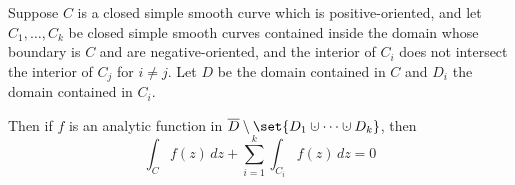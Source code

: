 \documentclass[10pt]{article}
\begin{document}
\begin{thrm*}

    Suppose $C$ is a closed simple smooth curve which is positive-oriented, and let $C_1,\dots,C_k$ be closed simple smooth curves contained inside the domain whose boundary is $C$ and are negative-oriented,
    and the interior of $C_i$ does not intersect the interior of $C_j$ for $i\neq j$.
    Let $D$ be the domain contained in $C$ and $D_i$ the domain contained in $C_i$.

    Then if $f$ is an analytic function in $\overline D\setminus\set{D_1\dcup\cdots\dcup D_k}$, then
    \[ \int_C f(z)\,dz + \sum_{i=1}^k \int_{C_i}f(z)\,dz = 0 \]

\end{thrm*}
\end{document}
